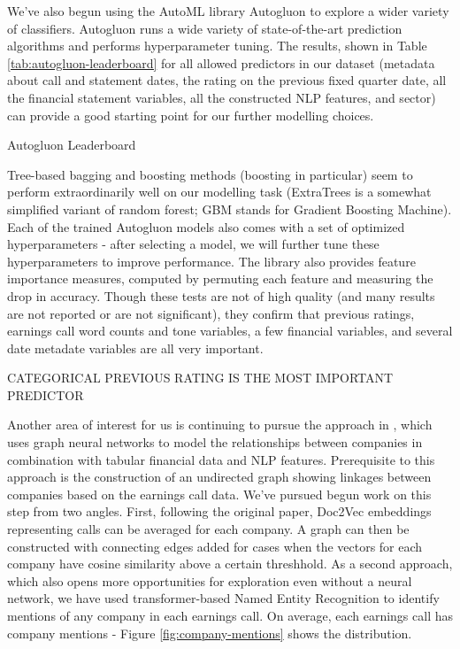 \documentclass{article}[11pt]
\begin{document}
    We've also begun using the AutoML library Autogluon to explore a wider variety of classifiers. Autogluon runs a wide variety of state-of-the-art prediction algorithms and performs hyperparameter tuning. The results, shown in Table \ref{tab:autogluon-leaderboard} for all allowed predictors in our dataset (metadata about call and statement dates, the rating on the previous fixed quarter date, all the financial statement variables, all the constructed NLP features, and sector) can provide a good starting point for our further modelling choices.

    \begin{table}
        \centering
        \caption{Autogluon Leaderboard}
        
        \label{tab:autogluon-leaderboard}
    \end{table}

    Tree-based bagging and boosting methods (boosting in particular) seem to perform extraordinarily well on our modelling task (ExtraTrees is a somewhat simplified variant of random forest; GBM stands for Gradient Boosting Machine). Each of the trained Autogluon models also comes with a set of optimized hyperparameters - after selecting a model, we will further tune these hyperparameters to improve performance. The library also provides feature importance measures, computed by permuting each feature and measuring the drop in accuracy. Though these tests are not of high quality (and many results are not reported or are not significant), they confirm that previous ratings, earnings call word counts and tone variables, a few financial variables, and several date metadate variables are all very important.

    CATEGORICAL PREVIOUS RATING IS THE MOST IMPORTANT PREDICTOR

    Another area of interest for us is continuing to pursue the approach in \cite{das_credit_2023}, which uses graph neural networks to model the relationships between companies in combination with tabular financial data and NLP features. Prerequisite to this approach is the construction of an undirected graph showing linkages between companies based on the earnings call data. We've pursued begun work on this step from two angles. First, following the original paper, Doc2Vec embeddings representing calls can be averaged for each company. A graph can then be constructed with connecting edges added for cases when the vectors for each company have cosine similarity above a certain threshhold. As a second approach, which also opens more opportunities for exploration even without a neural network, we have used transformer-based Named Entity Recognition to identify mentions of any company in each earnings call. On average, each earnings call has \avgCompanyMentions \space company mentions - Figure \ref{fig:company-mentions} shows the distribution.
\end{document}
